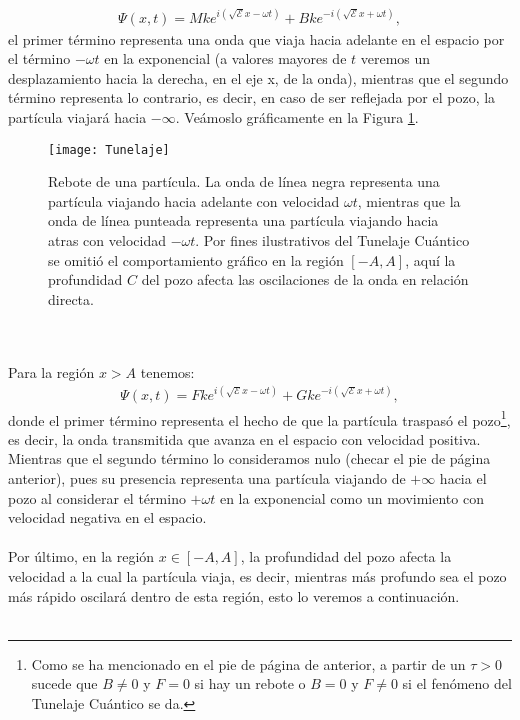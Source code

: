 \documentclass[12pt]{article}
\theoremstyle{definition}
\begin{document}
\begin{align*}
   \Psi(x,t) = Mke^{i(\sqrt{\mathcal{E}}x-\omega t)} + Bke^{-i(\sqrt{\mathcal{E}}x+\omega t)}, 
\end{align*}
 el primer término representa una onda que viaja hacia adelante en el espacio por el término $-\omega t$ en la exponencial (a valores mayores de $t$ veremos un desplazamiento hacia la derecha, en el eje x, de la onda), mientras que el segundo término representa lo contrario, es decir, en caso de ser reflejada por el pozo, la partícula viajará hacia $-\infty$. Veámoslo gráficamente en la Figura \ref{fig:Rebote}.
 \begin{figure}[h]
    \centering
    \texttt{[image: Tunelaje]}
    \caption{Rebote de una partícula. La onda de línea negra representa una partícula viajando hacia adelante con velocidad $\omega t$, mientras que la onda de línea punteada representa una partícula viajando hacia atras con velocidad $-\omega t$. Por fines ilustrativos del Tunelaje Cuántico se omitió el comportamiento gráfico en la región $[-A,A]$, aquí la profundidad $C$ del pozo afecta las oscilaciones de la onda en relación directa.}
    \label{fig:Rebote}
\end{figure}
\noindent
\\ \\
Para la región $x > A$ tenemos:
\begin{align*}
    \Psi(x,t) = Fke^{i(\sqrt{\mathcal{E}}x-\omega t)} + Gke^{-i(\sqrt{\mathcal{E}}x+\omega t)}, 
\end{align*}
donde el primer término  representa el hecho de que la partícula traspasó el pozo\footnote{Como se ha mencionado en el pie de página de anterior, a partir de un $\tau > 0$ sucede que $B\neq 0$ y $F=0$ si hay un rebote o $B=0$ y $F\neq 0$ si el fenómeno del Tunelaje Cuántico se da.}, es decir, la onda transmitida que avanza en el espacio con velocidad positiva. Mientras que el segundo término lo consideramos nulo (checar el pie de página anterior), pues su presencia representa una partícula viajando de $+\infty$ hacia el pozo al considerar el término $+\omega t$ en la exponencial como un movimiento con velocidad negativa en el espacio.
\\ \\
Por último, en la región $x \in [-A,A]$, la profundidad del pozo afecta la velocidad a la cual la partícula viaja, es decir, mientras más profundo sea el pozo más rápido oscilará dentro de esta región, esto lo veremos a continuación.
\\ \\
\end{document}
